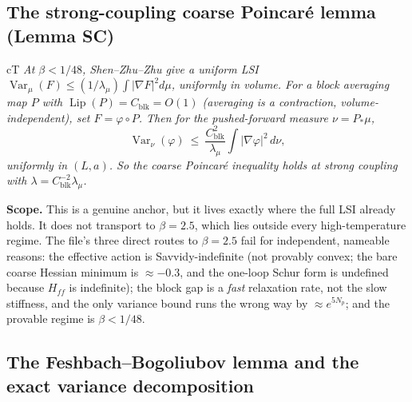 \subsection{The strong-coupling coarse Poincar\'e lemma (Lemma SC)}


\begin{claimbox}{cT}
 \emph{At $\beta<1/48$, Shen--Zhu--Zhu give a uniform LSI
$\operatorname{Var}_\mu(F)\le(1/\lambda_\mu)\int|\nabla F|^2d\mu$, uniformly in volume. For a
block averaging map $P$ with $\operatorname{Lip}(P)=C_{\mathrm{blk}}=O(1)$ (averaging is a
contraction, volume-independent), set $F=\varphi\circ P$. Then for the pushed-forward measure
$\nu=P_*\mu$,}
\begin{equation}
\operatorname{Var}_\nu(\varphi)\ \le\ \frac{C_{\mathrm{blk}}^2}{\lambda_\mu}
\int|\nabla\varphi|^2\,d\nu ,
\label{eq:sc}
\end{equation}
\emph{uniformly in $(L,a)$. So the coarse Poincar\'e inequality holds at strong coupling with
$\lambda=C_{\mathrm{blk}}^{-2}\lambda_\mu$.}
\end{claimbox}

\textbf{Scope.} This is a genuine anchor, but it lives exactly where the full LSI already holds.
It does not transport to $\beta=2.5$, which lies outside every high-temperature regime. The
file's three direct routes to $\beta=2.5$ fail for independent, nameable reasons: the effective
action is Savvidy-indefinite (not provably convex; the bare coarse Hessian minimum is
$\approx-0.3$, and the one-loop Schur form is undefined because $H_{ff}$ is indefinite); the
block gap is a \emph{fast} relaxation rate, not the slow stiffness, and the only variance bound
runs the wrong way by $\approx e^{5N_p}$; and the provable regime is $\beta<1/48$.

\subsection{The Feshbach--Bogoliubov lemma and the exact variance decomposition}
\label{sec:feshbach}


